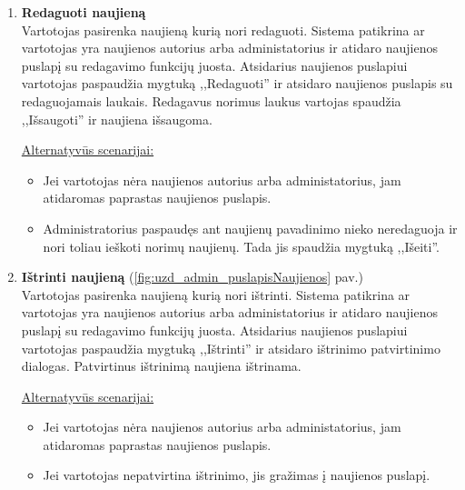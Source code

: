 \documentclass{VUMIFPSkursinis}
\begin{document}
\begin{enumerate} [label = \textbf{U\arabic*.}]
			\item \textbf{Redaguoti naujieną}   \\
					Vartotojas pasirenka naujieną kurią nori redaguoti. Sistema patikrina ar vartotojas yra naujienos autorius arba administatorius ir atidaro naujienos puslapį su redagavimo funkcijų juosta. Atsidarius naujienos puslapiui vartotojas paspaudžia mygtuką ,,Redaguoti'' ir atsidaro naujienos puslapis su redaguojamais laukais. Redagavus norimus laukus vartojas spaudžia ,,Išsaugoti'' ir naujiena išsaugoma.
					
					\underline{Alternatyvūs scenarijai:}
					\begin{itemize}
						\item Jei vartotojas nėra naujienos autorius arba administatorius, jam atidaromas paprastas naujienos puslapis.
						\item Administratorius paspaudęs ant naujienų pavadinimo nieko neredaguoja ir nori toliau ieškoti norimų naujienų. Tada jis spaudžia mygtuką ,,Išeiti''.
					\end{itemize}	
					
			
			\item \textbf{Ištrinti naujieną} (\ref{fig:uzd_admin_puslapisNaujienos} pav.)\\
					Vartotojas pasirenka naujieną kurią nori ištrinti. Sistema patikrina ar vartotojas yra naujienos autorius arba administatorius ir atidaro naujienos puslapį su redagavimo funkcijų juosta. Atsidarius naujienos puslapiui vartotojas paspaudžia mygtuką ,,Ištrinti'' ir atsidaro ištrinimo patvirtinimo dialogas. Patvirtinus ištrinimą naujiena ištrinama.
					
					\underline{Alternatyvūs scenarijai:}
					\begin{itemize}
						\item Jei vartotojas nėra naujienos autorius arba administatorius, jam atidaromas paprastas naujienos puslapis.
						\item Jei vartotojas nepatvirtina ištrinimo, jis gražimas į naujienos puslapį.
					\end{itemize}
				

\end{enumerate}
\end{document}
